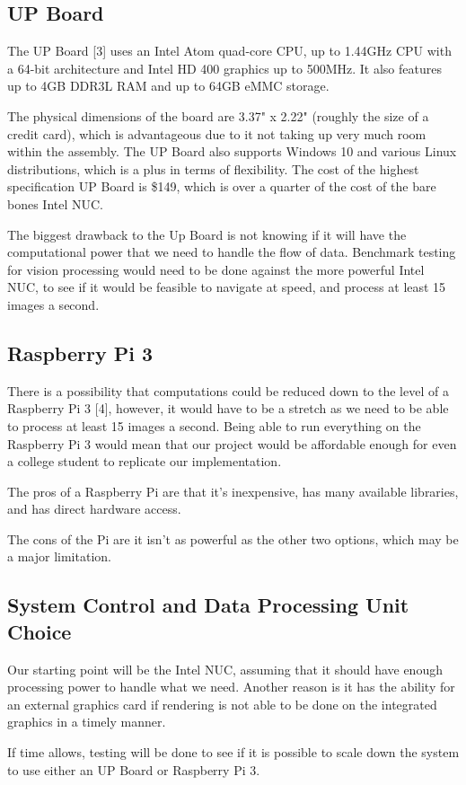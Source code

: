 \documentclass[compsoc,draftclsnofoot,onecolumn,10pt]{IEEEtran}
\begin{document}
\subsection{UP Board}
The UP Board [3] uses an Intel Atom quad-core CPU, up to 1.44GHz CPU with a 64-bit architecture and Intel HD 400 graphics up to 500MHz. 
It also features up to 4GB DDR3L RAM and up to 64GB eMMC storage. \par
The physical dimensions of the board are 3.37" x 2.22" (roughly the size of a credit card), which is advantageous due to it not taking up very much room within the assembly. 
The UP Board also supports Windows 10 and various Linux distributions, which is a plus in terms of flexibility. 
The cost of the highest specification UP Board is \$149, which is over a quarter of the cost of the bare bones Intel NUC. \par
The biggest drawback to the Up Board is not knowing if it will have the computational power that we need to handle the flow of data. 
Benchmark testing for vision processing would need to be done against the more powerful Intel NUC, to see if it would be feasible to navigate at speed, and process at least 15 images a second. 

\subsection{Raspberry Pi 3}
There is a possibility that  computations could be reduced down to the level of a Raspberry Pi 3 [4], however, it would have to be a stretch as we need to be able to process at least 15 images a second. 
Being able to run everything on the Raspberry Pi 3 would mean that our project would be affordable enough for even a college student to replicate our implementation. \par
The pros of a Raspberry Pi are that it's inexpensive, has many available libraries, and has direct hardware access. \par
The cons of the Pi are it isn't as powerful as the other two options, which may be a major limitation. 

\subsection{System Control and Data Processing Unit Choice}
Our starting point will be the Intel NUC, assuming that it should have enough processing power to handle what we need. Another reason is it has the ability for an external graphics card if rendering is not able to be done on the integrated graphics in a timely manner. \par
If time allows, testing will be done to see if it is possible to scale down the system to use either an UP Board or Raspberry Pi 3.
\end{document}
